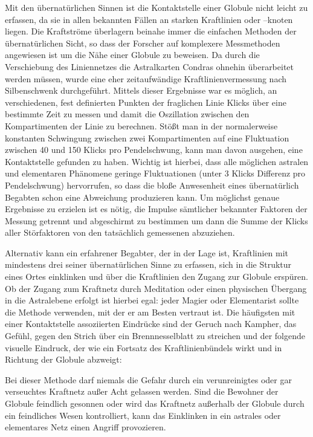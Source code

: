 \documentclass[a5paper,8pt]{book}
\begin{document}
Mit den übernatürlichen Sinnen ist die Kontaktstelle einer Globule nicht leicht zu erfassen, da sie in allen bekannten 
Fällen an starken Kraftlinien oder –knoten liegen. Die Kraftströme überlagern beinahe immer die einfachen Methoden der 
übernatürlichen Sicht, so dass der Forscher auf komplexere Messmethoden angewiesen ist um die Nähe einer Globule zu 
beweisen. Da durch die Verschiebung des Liniennetzes die Astralkarten Condras ohnehin überarbeitet werden müssen, wurde 
eine eher zeitaufwändige Kraftlinienvermessung nach Silbenschwenk durchgeführt. Mittels dieser Ergebnisse war es möglich, 
an verschiedenen, fest definierten Punkten der fraglichen Linie Klicks über eine bestimmte Zeit zu messen und damit die 
Oszillation zwischen den Kompartimenten der Linie zu berechnen.
Stößt man in der normalerweise konstanten Schwingung zwischen zwei Kompartimenten auf eine Fluktuation zwischen 40 und 
150 Klicks pro Pendelschwung, kann man davon ausgehen, eine Kontaktstelle gefunden zu haben. Wichtig ist hierbei, dass 
alle möglichen astralen und elementaren Phänomene geringe Fluktuationen (unter 3 Klicks Differenz pro Pendelschwung) 
hervorrufen, so dass die bloße Anwesenheit eines übernatürlich Begabten schon eine Abweichung produzieren kann. Um 
möglichst genaue Ergebnisse zu erzielen ist es nötig, die Impulse sämtlicher bekannter Faktoren der Messung getrennt und 
abgeschirmt zu bestimmen um dann die Summe der Klicks aller Störfaktoren von den tatsächlich gemessenen abzuziehen. 

Alternativ kann ein erfahrener Begabter, der in der Lage ist, Kraftlinien mit mindestens drei seiner übernatürlichen Sinne 
zu erfassen, sich in die Struktur eines Ortes einklinken und über die Kraftlinien den Zugang zur Globule erspüren. Ob der 
Zugang zum Kraftnetz durch Meditation oder einen physischen Übergang in die Astralebene erfolgt ist hierbei egal: jeder 
Magier oder Elementarist sollte die Methode verwenden, mit der er am Besten vertraut ist. Die häufigsten mit einer 
Kontaktstelle assoziierten Eindrücke sind der Geruch nach Kampher, das Gefühl, gegen den Strich über ein Brennnesselblatt 
zu streichen und der folgende visuelle Eindruck, der wie ein Fortsatz des Kraftlinienbündels wirkt und in Richtung der 
Globule abzweigt:

Bei dieser Methode darf niemals die Gefahr durch ein verunreinigtes oder gar verseuchtes Kraftnetz außer Acht gelassen 
werden. Sind die Bewohner der Globule feindlich gesonnen oder wird das Kraftnetz außerhalb der Globule durch ein 
feindliches Wesen kontrolliert, kann das Einklinken in ein astrales oder elementares Netz einen Angriff provozieren. 
\end{document}
